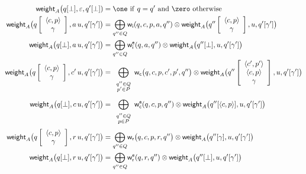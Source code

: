 \begin{align}
%
\weight_A\bigl(\config{q}{\bot}, \varepsilon, \config{q'}{\bot}) & = \one
\mathrm{~if~} q = q' \mathrm{~and~} \zero \mathrm{~otherwise}\label{eq:SWVPA-weight}\\
\weight_A\bigl(\configup{q}{\<{\call{c}}, p>\stackup\gamma}, a\, u,
               \config{q'}{\gamma'}\bigr) & =
 {\displaystyle\bigoplus_{q'' \in Q}} \weii(q, c, p, a, q'')
  \otimes \weight_A\bigl(\configup{q''}{\<{\call{c}}, p> \stackup \gamma}, u,
                         \config{q'}{\gamma'}\bigr)\nonumber\\
%
\weight_A\bigl(\config{q}{\bot}, a\, u,
               \config{q'}{\gamma'}\bigr) & =
  {\displaystyle\bigoplus_{q'' \in Q}} \weiei(q, a, q'')
   \otimes \weight_A\bigl(\config{q''}{\bot}, u, \config{q'}{\gamma'}\bigr)\nonumber\\
%
\weight_A\bigl(\configup{q}{\<{\call{c}}, p>\stackup\gamma}, {\call{c}'}\, u,
               \config{q'}{\gamma'}\bigr) & =
 {\displaystyle\bigoplus_{\begin{array}{c}
                          \scriptstyle q'' \in Q\\[-1ex]
                          \scriptstyle p' \in P
                          \end{array}}}
 \weic\bigl(q, {\call{c}}, p, {\call{c}'}, p', q''\bigr)
 \otimes \weight_A\bigl(\configup{q''}{\<{\call{c}'}, p'>\stackup \<{\call{c}}, p>\stackup \gamma}, u,
                        \config{q'}{\gamma'}\bigr)\nonumber\\[1mm]
%
\weight_A\bigl(\config{q}{\bot}, {\call{c}}\, u,
               \config{q'}{\gamma'}\bigr) & =
 {\displaystyle\bigoplus_{\begin{array}{c}
                          \scriptstyle q'' \in Q\\[-1ex]
                          \scriptstyle p \in P
                          \end{array}}}
  \weiec(q, {\call{c}}, p, q'')
  \otimes \weight_A\bigl(\config{q''}{\<{\call{c}}, p>}, u,
                         \config{q'}{\gamma'}\bigr)\nonumber\\
%
\weight_A\bigl(\configup{q}{\<{\call{c}}, p>\stackup\gamma}, {\return{r}}\, u,
               \config{q'}{\gamma'}\bigr) & =
 {\displaystyle\bigoplus_{q'' \in Q}}
  \weir\bigl(q, {\call{c}}, p, {\return{r}}, q''\bigr)
  \otimes \weight_A\bigl(\config{q''}{\gamma}, u,
                         \config{q'}{\gamma'}\bigr)\nonumber\\
%
\weight_A\bigl(\config{q}{\bot}, {\return{r}}\, u,
               \config{q'}{\gamma'}\bigr) & =
 {\displaystyle\bigoplus_{q'' \in Q}} \weier(q, {\return{r}}, q'')
  \otimes \weight_A\bigl(\config{q''}{\bot}, u,
                         \config{q'}{\gamma'}\bigr)\nonumber
\end{align}
